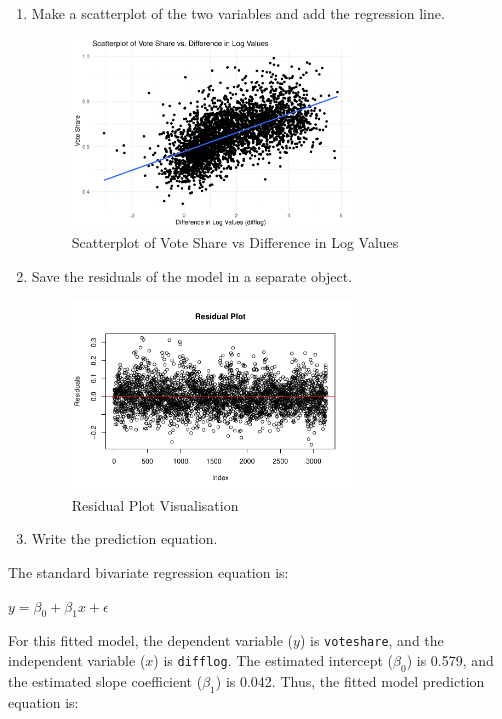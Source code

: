 \documentclass[12pt,letterpaper]{article}
\begin{document}
\begin{enumerate}
		
			\item Make a scatterplot of the two variables and add the regression line. 		
		\begin{figure}[H]
			\centering
			\includegraphics[width=0.7\textwidth]{ScatterPlot1.pdf}  %
			\caption{Scatterplot of Vote Share vs Difference in Log Values}
			\label{fig:pdf}
		\end{figure}
					 
		
		\newpage
		\item Save the residuals of the model in a separate object.	
		\begin{figure}[H]
		\centering
		\includegraphics[width=0.7\textwidth]{ResidualPlot.pdf}  %
		\caption{Residual Plot Visualisation}
		\label{fig:pdf}
	\end{figure}
							 
		
		\item Write the prediction equation.
	\end{enumerate}
The standard bivariate regression equation is: 

\begin{center}
	$y = \beta_0 + \beta_1 x + \epsilon$
\end{center}
For this fitted model, the dependent variable ($y$) is \texttt{voteshare}, and the independent variable ($x$) is \texttt{difflog}. The estimated intercept ($\beta_0$) is 0.579, and the estimated slope coefficient ($\beta_1$) is 0.042. Thus, the fitted model prediction equation is:
	
\end{document}
